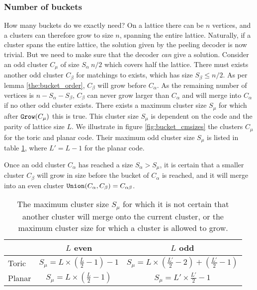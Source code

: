 \subsubsection{Number of buckets}
How many buckets do we exactly need? On a lattice there can be $n$ vertices, and a clusters can therefore grow to size $n$, spanning the entire lattice. Naturally, if a cluster spans the entire lattice, the solution given by the peeling decoder is now trivial. But we need to make sure that the decoder \emph{can} give a solution. Consider an odd cluster $C_\mu$ of size $S_\alpha~n/2$ which covers half the lattice. There must exists another odd cluster $C_\beta$ for matchings to exists, which has size $S_\beta\leq n/2$.
As per lemma \ref{the:bucket_order}, $C_\beta$ will grow before $C_\alpha$. As the remaining number of vertices is $n-S_\alpha-S_\beta$, $C_\beta$ can never grow larger than $C_\alpha$ and will merge into $C_\alpha$ if no other odd cluster exists. There exists a maximum cluster size $S_\mu$ for which after $\texttt{Grow}(C_\mu)$ this is true. This cluster size $S_\mu$ is dependent on the code and the parity of lattice size $L$. We illustrate in figure \ref{fig:bucket_cmsizes} the clusters $C_\mu$ for the toric and planar code. Their maximum odd cluster size $S_\mu$ is listed in table \ref{tab_smax}, where $L'=L-1$ for the planar code.

\begin{lemma}
  Once an odd cluster $C_\alpha$ has reached a size $S_\alpha > S_\mu$, it is certain that a smaller cluster $C_\beta$ will grow in size before the bucket of $C_\alpha$ is reached, and it will merge into an even cluster $\texttt{Union}(C_\alpha, C_\beta) = C_{\alpha\beta}$.
\end{lemma}

\begin{table}
  \centering
  \begin{tabular}{|l|c|c|}
    \hline
           & $L$ even                             & $L$ odd                                                 \\
    \hline
    Toric  & $S_\mu = L\times (\frac{L}{2}-1) -1$ & $S_\mu = L\times ( \frac{L'}{2} -2) + (\frac{L'}{2}-1)$ \\
    \hline
    Planar & $S_\mu = L \times (\frac{L}{2} -1) $ & $S_\mu = L'\times \frac{L'}{2} -1$                      \\
    \hline
  \end{tabular}
  \caption{The maximum cluster size $S_\mu$ for which it is not certain that another cluster will merge onto the current cluster, or the maximum cluster size for which a cluster is allowed to grow.  }\label{tab_smax}
\end{table}


